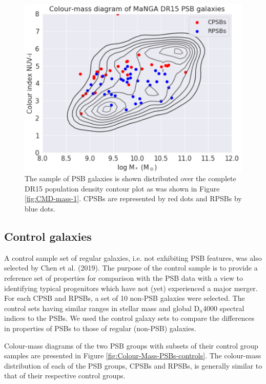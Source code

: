 \begin{figure}
    \centering
    \includegraphics[width=\columnwidth]{images/CMDs/CMD-CPSB+RPSB-15.png}
    \caption[Colour-mass distribution of PSBs]{The sample of PSB galaxies is shown distributed over the complete DR15 population density contour plot as was shown in Figure \ref{fig:CMD-mass-1}. CPSBs are represented by red dots and RPSBs by blue dots.}
    \label{fig:Colour-Mass-PSBs}
\end{figure}

\subsection{Control galaxies}
\label{sec:controls}
A control sample set of regular galaxies, i.e. not exhibiting PSB features, was also selected by Chen et al. (2019). The purpose of the control sample is to provide a reference set of properties for comparison with the PSB data with a view to identifying typical progenitors which have not (yet) experienced a major merger. For each CPSB and RPSBs, a set of 10 non-PSB galaxies were selected. The control sets having similar ranges in stellar mass and global D$_n$4000 spectral indices to the PSBs. We used the control galaxy sets to compare the differences in properties of PSBs to those of regular (non-PSB) galaxies.

Colour-mass diagrams of the two PSB groups with subsets of their control group samples are presented in Figure \ref{fig:Colour-Mass-PSBs-controls}. The colour-mass distribution of each of the PSB groups, CPSBs and RPSBs, is generally similar to that of their respective control groups.


